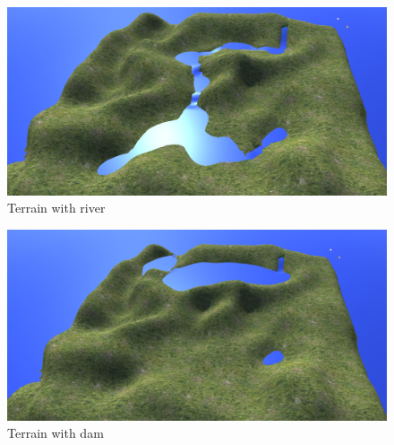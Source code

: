 \documentclass[12pt, letterpaper]{scrartcl}
\begin{document}
	\begin{figure}[H]
		\centering
		\includegraphics[width=\textwidth]{images//interim/river1}
		\caption{Terrain with river}
		\label{fig:river1}
	\end{figure}
	
	\begin{figure}[H]
		\centering
		\includegraphics[width=\textwidth]{images//interim/river2}
		\caption{Terrain with dam}
		\label{fig:river2}
	\end{figure}
	
\end{document}
